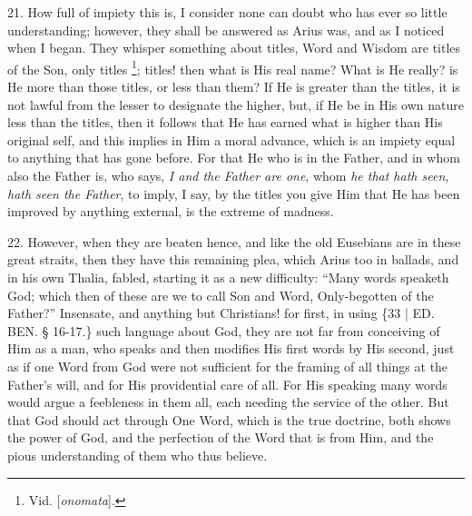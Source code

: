 21. How full of impiety this
is, I consider none can doubt who has ever so little understanding;
however, they shall be answered as Arius was, and as I noticed when I
began. They whisper something about titles, Word and Wisdom are titles
of the Son, only titles \footnote{Vid. [\emph{onomata}].};
titles! then what is His real name? What is He really? is He more than
those titles, or less than them? If He is greater than the titles, it
is not lawful from the lesser to designate the higher, but, if He be
in His own nature less than the titles, then it follows that He has
earned what is higher than His original self, and this implies in Him
a moral advance, which is an impiety equal to anything that has gone
before. For that He who is in the Father, and in whom also the Father
is, who says, \emph{I and the Father are one}, whom \emph{he that hath
seen, hath seen the Father}, to imply, I say, by the titles you
give Him that He has been improved by anything external, is the
extreme of madness.

22. However, when they are
beaten hence, and like the old Eusebians are in these great straits,
then they have this remaining plea, which Arius too in ballads, and in
his own Thalia, fabled, starting it as a new difficulty: ``Many words
speaketh God; which then of these are we to call Son and Word,
Only-begotten of the Father?'' Insensate, and anything but Christians!
for first, in using \{33 | ED.
BEN.
§ 16-17.\} such language about God, they are not far from conceiving
of Him as a man, who speaks and then modifies His first words by His
second, just as if one Word from God were not sufficient for the
framing of all things at the Father's will, and for His providential
care of all. For His speaking many words would argue a feebleness in
them all, each needing the service of the other. But that God should
act through One Word, which is the true doctrine, both shows the power
of God, and the perfection of the Word that is from Him, and the pious
understanding of them who thus believe.

